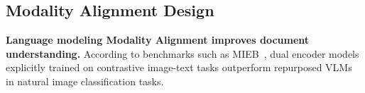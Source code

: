 
\subsection{Modality Alignment Design}
\label{sec:ablation_tasks}

\noindent\textbf{Language modeling Modality Alignment improves document understanding.}
According to benchmarks such as MIEB~, dual encoder models explicitly trained on contrastive image-text tasks outperform repurposed VLMs in natural image classification tasks. 
